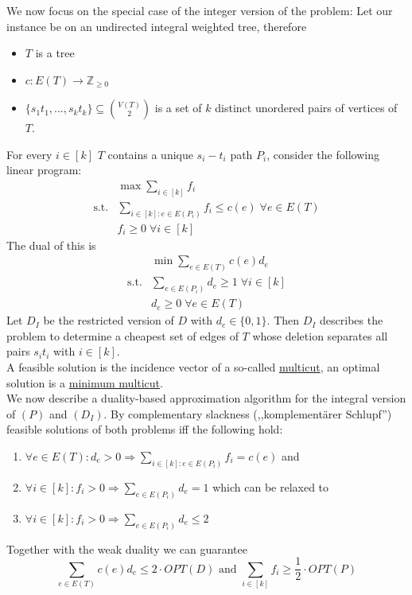 \documentclass[a4paper, 12pt]{article}
\begin{document}
	We now focus on the special case of the integer version of the problem: Let our instance be on an undirected integral weighted tree, therefore \begin{itemize}
		\item $T$ is a tree
		\item $c: E(T) \to \mathbb{Z}_{\geq 0}$
		\item $\{s_1t_1,...,s_kt_k\} \subseteq \binom{V(T)}{2}$ is a set of $k$ distinct unordered pairs of vertices of $T$. 
	\end{itemize} 
	For every $i \in [k]$ $T$ contains a unique $s_i-t_i$ path $P_i$, consider the following linear program: \begin{align*}
		&\max \sum_{i \in [k]} f_i\\
		\text{s.t.} &\sum_{i \in [k]: e \in E(P_i)} f_i \leq c(e) \;\forall e \in E(T)\\
		&f_i \geq 0 \;\forall i \in [k]
	\end{align*}
	The dual of this is \begin{align*}
		&\min \sum_{e \in E(T)} c(e)d_e\\
		\text{s.t.} &\sum_{e \in E(P_i)} d_e \geq 1 \; \forall i \in [k]\\
		&d_e \geq 0 \; \forall e \in E(T)
	\end{align*}
	Let $D_I$ be the restricted version of $D$ with $d_e \in \{0,1\}$. Then $D_I$ describes the problem to determine a cheapest set of edges of $T$ whose deletion separates all pairs $s_it_i$ with $i \in [k]$.\\
	A feasible solution is the incidence vector of a so-called \underline{multicut}, an optimal solution is a \underline{minimum multicut}.\\
	We now describe a duality-based approximation algorithm for the integral version of $(P)$ and $(D_I)$. By complementary slackness (,,komplementärer Schlupf'') feasible solutions of both problems iff the following hold: \begin{enumerate}
		\item $\forall e \in E(T): d_e > 0 \Rightarrow \sum_{i \in [k]: e \in E(P_i)} f_i = c(e)$ and 
		\item $\forall i \in [k]: f_i >0 \Rightarrow \sum_{e \in E(P_i)} d_e = 1$ which can be relaxed to
		\item $\forall i \in [k]: f_i>0 \Rightarrow \sum_{e \in E(P_i)} d_e \leq 2$
	\end{enumerate}
	Together with the weak duality we can guarantee \[\sum_{e \in E(T)} c(e)d_e \leq 2\cdot OPT(D) \text{ and } \sum_{i \in [k]} f_i \geq \frac{1}{2}\cdot OPT(P)\]
\end{document}
